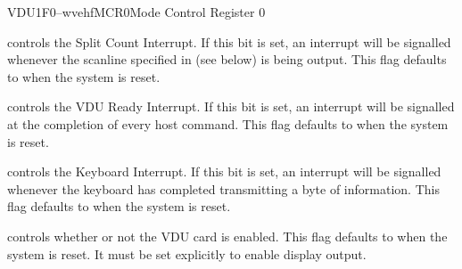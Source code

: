 \begin{ioport}{VDU}{1F0}{--wvehf}{MCR0}{Mode Control Register 0}
\begin{description}
     controls the Split Count Interrupt. If this bit is
    set, an interrupt will be signalled whenever the scanline specified in
     (see below) is being output. This flag defaults to 
    when the system is reset.

     controls the VDU Ready Interrupt. If this bit is set, an
    interrupt will be signalled at the completion of every host command.  This
    flag defaults to  when the system is reset.

     controls the Keyboard Interrupt. If this bit is set, an
    interrupt will be signalled whenever the keyboard has completed
    transmitting a byte of information. This flag defaults to  when the
    system is reset.

     controls whether or not the VDU card is enabled. This
    flag defaults to  when the system is reset. It must be set
    explicitly to enable display output.

  \end{description}

\end{ioport}



